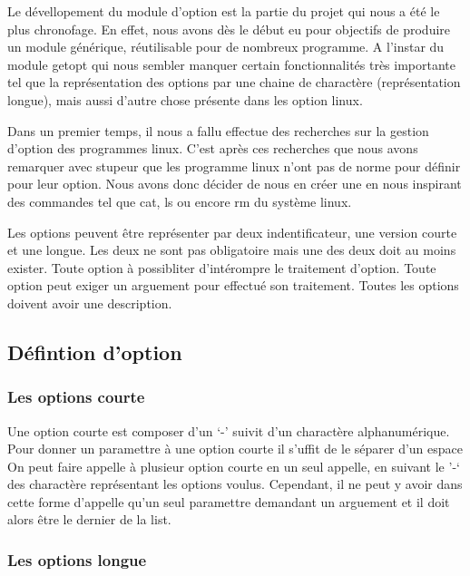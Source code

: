 \documentclass[12pt]{article}
\begin{document}
    Le dévellopement du module d'option est la partie du projet qui nous a été 
    le plus chronofage. En effet, nous avons dès le début eu pour objectifs de 
    produire un module générique, réutilisable pour de nombreux programme. A 
    l'instar du module getopt qui nous sembler manquer certain fonctionnalités
    très importante tel que la représentation des options par une chaine de 
    charactère (représentation longue), mais aussi d'autre chose présente dans 
    les option linux. 

    Dans un premier temps, il nous a fallu effectue des recherches sur la 
    gestion d'option des programmes linux. C'est après ces recherches que nous 
    avons remarquer avec stupeur que les programme linux n'ont pas de norme pour 
    définir pour leur option. Nous avons donc décider de nous en créer une en 
    nous inspirant des commandes tel que cat, ls ou encore rm du système linux.

    Les options peuvent être représenter par deux indentificateur, une version 
    courte et une longue. Les deux ne sont pas obligatoire mais une des deux 
    doit au moins exister. Toute option à possibliter d'intérompre le traitement 
    d'option. Toute option peut exiger un arguement pour effectué son 
    traitement. Toutes les options doivent avoir une description. 

    \subsection{Défintion d'option}

    \subsubsection{Les options courte}

    Une option courte est composer d'un `-' suivit d'un charactère 
    alphanumérique. Pour donner un paramettre à une option courte il s'uffit de 
    le séparer d'un espace On peut faire appelle à plusieur option courte en un 
    seul  appelle, en suivant le '-` des charactère représentant les options 
    voulus. Cependant, il ne peut y avoir dans cette forme d'appelle qu'un seul 
    paramettre demandant un arguement et il doit alors être le dernier de la 
    list. 

    \subsubsection{Les options longue}
\end{document}
